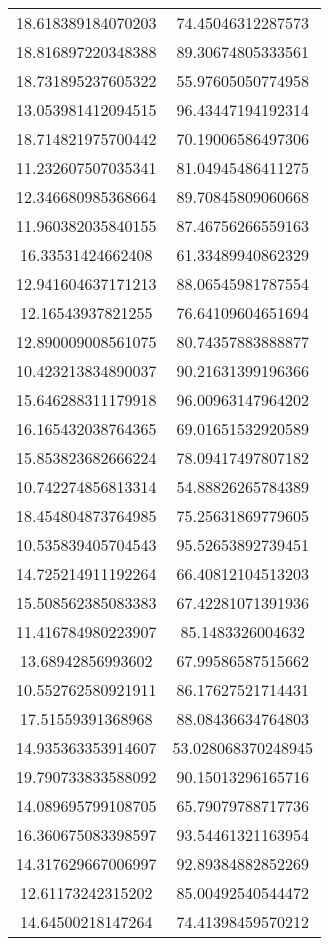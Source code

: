 \begin{table}
\begin{tabular}{cc}
18.618389184070203 & 74.45046312287573 \\
18.816897220348388 & 89.30674805333561 \\
18.731895237605322 & 55.97605050774958 \\
13.053981412094515 & 96.43447194192314 \\
18.714821975700442 & 70.19006586497306 \\
11.232607507035341 & 81.04945486411275 \\
12.346680985368664 & 89.70845809060668 \\
11.960382035840155 & 87.46756266559163 \\
16.33531424662408 & 61.33489940862329 \\
12.941604637171213 & 88.06545981787554 \\
12.16543937821255 & 76.64109604651694 \\
12.890009008561075 & 80.74357883888877 \\
10.423213834890037 & 90.21631399196366 \\
15.646288311179918 & 96.00963147964202 \\
16.165432038764365 & 69.01651532920589 \\
15.853823682666224 & 78.09417497807182 \\
10.742274856813314 & 54.88826265784389 \\
18.454804873764985 & 75.25631869779605 \\
10.535839405704543 & 95.52653892739451 \\
14.725214911192264 & 66.40812104513203 \\
15.508562385083383 & 67.42281071391936 \\
11.416784980223907 & 85.1483326004632 \\
13.68942856993602 & 67.99586587515662 \\
10.552762580921911 & 86.17627521714431 \\
17.51559391368968 & 88.08436634764803 \\
14.935363353914607 & 53.028068370248945 \\
19.790733833588092 & 90.15013296165716 \\
14.089695799108705 & 65.79079788717736 \\
16.360675083398597 & 93.54461321163954 \\
14.317629667006997 & 92.89384882852269 \\
12.61173242315202 & 85.00492540544472 \\
14.64500218147264 & 74.41398459570212 \\

\end{tabular}
\end{table}

